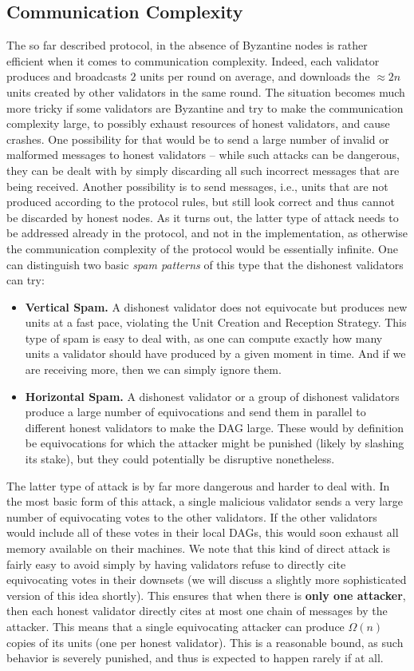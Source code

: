 \documentclass[12pt, fleqn]{article}
\begin{document}
\subsection{Communication Complexity}
The so far described protocol, in the absence of Byzantine nodes is rather efficient when it comes to communication complexity.
%
Indeed, each validator produces and broadcasts $2$ units per round on average, and downloads the $\approx 2n$ units created by other validators in the same round.
%
The situation becomes much more tricky if some validators are Byzantine and try to make the communication complexity large, to possibly exhaust resources of honest validators, and cause crashes. 
%
One possibility for that would be to send a large number of invalid or malformed messages to honest validators -- while such attacks can be dangerous, they can be dealt with by simply discarding all such incorrect messages that are being received.
%
Another possibility is to send messages, i.e., units that are not produced according to the protocol rules, but still look correct and thus cannot be discarded by honest nodes.
%
As it turns out, the latter type of attack needs to be addressed already in the protocol, and not in the implementation, as otherwise the communication complexity of the protocol would be essentially infinite.
%
One can distinguish two basic {\it spam patterns} of this type that the dishonest validators can try:
\begin{itemize}
    \item {\bf Vertical Spam.} A dishonest validator does not equivocate but produces new units at a fast pace, violating the Unit Creation and Reception Strategy. This type of spam is easy to deal with, as one can compute exactly how many units a validator should have produced by a given moment in time. And if we are receiving more, then we can simply ignore them. 
    \item {\bf Horizontal Spam.} A dishonest validator or a group of dishonest validators produce a large number of equivocations and send them in parallel to different honest validators to make the DAG large. These would by definition be equivocations for which the attacker might be punished (likely by slashing its stake), but they could potentially be disruptive nonetheless.
\end{itemize}
The latter type of attack is by far more dangerous and harder to deal with.
%
In the most basic form of this attack, a single malicious validator sends a very large number of equivocating votes to the other validators.
%
If the other validators would include all of these votes in their local DAGs, this would soon exhaust all memory available on their machines.
%
We note that this kind of direct attack is fairly easy to avoid simply by having validators refuse to directly cite equivocating votes in their downsets (we will discuss a slightly more sophisticated version of this idea shortly).
%
This ensures that when there is {\bf only one attacker}, then each honest validator directly cites at most one chain of messages by the attacker.
%
This means that a single equivocating attacker can produce $\Omega(n)$ copies of its units (one per honest validator).
%
This is a reasonable bound, as such behavior is severely punished, and thus is expected to happen rarely if at all.
\end{document}
